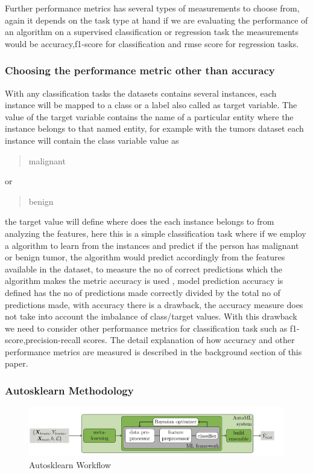 Further performance metrics has several types of measurements to choose from, again it depends on the task type at hand if we are evaluating the performance of an algorithm on a supervised classification or regression task the measurements would be accuracy,f1-score for classification and rmse score for regression tasks.

\subsubsection{Choosing the performance metric other than accuracy}
    
 With any classification tasks the datasets contains several instances, each instance will be mapped to a class or a label also called as target variable. The value of the target variable contains the name of a particular entity where the instance belongs to that named entity, for example with the tumors dataset each instance will contain the class variable value as \blockquote{malignant} or \blockquote{benign} the target value will define where does the each instance belongs to from analyzing the features, here this is a simple classification task where if we employ a algorithm to learn from the instances and predict if the person has malignant or benign tumor, the algorithm would predict accordingly from the features available in the dataset, to measure the no of correct predictions which the algorithm makes the metric accuracy is used , model prediction accuracy is defined has the no of predictions made correctly divided by the total no of predictions made, with accuracy there is a drawback, the accuracy measure does not take into account the imbalance of class/target values. With this drawback we need to consider other performance metrics for classification task such as f1-score,precision-recall scores. The detail explanation of how accuracy and other performance metrics are measured is described in the background section of this paper.

 
    
\subsubsection{Autosklearn Methodology}
    
    \begin{figure}[!h]
    	\centering
    	\includegraphics[width=1.1\linewidth]{thesis_template/images/autosklearn.png}
    	\caption{Autosklearn Workflow}
    	\label{fig:autosklearn_workflow}
    \end{figure}
    
